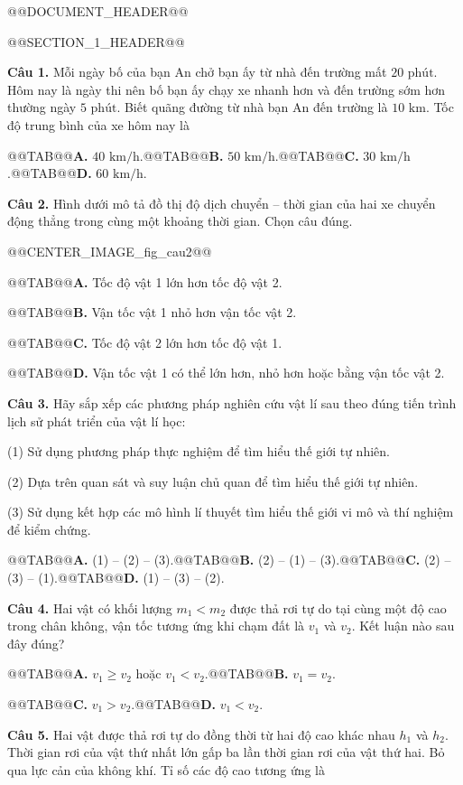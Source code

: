 \documentclass{article}
\begin{document}
@@DOCUMENT_HEADER@@

@@SECTION_1_HEADER@@

\textbf{Câu 1.} Mỗi ngày bố của bạn An chở bạn ấy từ nhà đến trường mất $20\text{ phút}$. Hôm nay là ngày thi nên bố bạn ấy chạy xe nhanh hơn và đến trường sớm hơn thường ngày $5\text{ phút}$. Biết quãng đường từ nhà bạn An đến trường là $10\text{ km}$. Tốc độ trung bình của xe hôm nay là

@@TAB@@\textbf{A.} $40\text{ km/h}$.@@TAB@@\textbf{B.} $50\text{ km/h}$.@@TAB@@\textbf{C.} $30\text{ km/h}$.@@TAB@@\textbf{D.} $60\text{ km/h}$.

\textbf{Câu 2.} Hình dưới mô tả đồ thị độ dịch chuyển -- thời gian của hai xe chuyển động thẳng trong cùng một khoảng thời gian. Chọn câu đúng.

@@CENTER_IMAGE_fig_cau2@@

@@TAB@@\textbf{A.} Tốc độ vật 1 lớn hơn tốc độ vật 2.

@@TAB@@\textbf{B.} Vận tốc vật 1 nhỏ hơn vận tốc vật 2.

@@TAB@@\textbf{C.} Tốc độ vật 2 lớn hơn tốc độ vật 1.

@@TAB@@\textbf{D.} Vận tốc vật 1 có thể lớn hơn, nhỏ hơn hoặc bằng vận tốc vật 2.

\textbf{Câu 3.} Hãy sắp xếp các phương pháp nghiên cứu vật lí sau theo đúng tiến trình lịch sử phát triển của vật lí học:

 (1) Sử dụng phương pháp thực nghiệm để tìm hiểu thế giới tự nhiên.

 (2) Dựa trên quan sát và suy luận chủ quan để tìm hiểu thế giới tự nhiên.

 (3) Sử dụng kết hợp các mô hình lí thuyết tìm hiểu thế giới vi mô và thí nghiệm để kiểm chứng.

@@TAB@@\textbf{A.} (1) -- (2) -- (3).@@TAB@@\textbf{B.} (2) -- (1) -- (3).@@TAB@@\textbf{C.} (2) -- (3) -- (1).@@TAB@@\textbf{D.} (1) -- (3) -- (2).

\textbf{Câu 4.} Hai vật có khối lượng $m_1 < m_2$ được thả rơi tự do tại cùng một độ cao trong chân không, vận tốc tương ứng khi chạm đất là $v_1$ và $v_2$. Kết luận nào sau đây đúng?

@@TAB@@\textbf{A.} $v_1 \ge v_2$ hoặc $v_1 < v_2$.@@TAB@@\textbf{B.} $v_1 = v_2$.

@@TAB@@\textbf{C.} $v_1 > v_2$.@@TAB@@\textbf{D.} $v_1 < v_2$.

\textbf{Câu 5.} Hai vật được thả rơi tự do đồng thời từ hai độ cao khác nhau $h_1$ và $h_2$. Thời gian rơi của vật thứ nhất lớn gấp ba lần thời gian rơi của vật thứ hai. Bỏ qua lực cản của không khí. Tỉ số các độ cao tương ứng là
\end{document}
